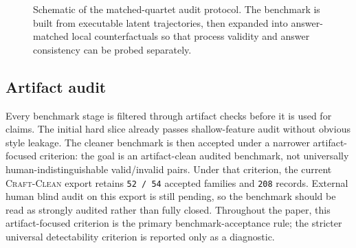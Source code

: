 \begin{figure}[t]
\centering
\setlength{\fboxsep}{10pt}
\caption{Schematic of the matched-quartet audit protocol. The benchmark is built
from executable latent trajectories, then expanded into answer-matched local
counterfactuals so that process validity and answer consistency can be probed
separately.}
\label{fig:quartet_protocol}
\end{figure}

\subsection{Artifact audit}

Every benchmark stage is filtered through artifact checks before it is used for
claims. The initial hard slice already passes shallow-feature audit without
obvious style leakage. The cleaner benchmark is then accepted under a narrower
artifact-focused criterion: the goal is an artifact-clean audited benchmark,
not universally human-indistinguishable valid/invalid pairs. Under that
criterion, the current \textsc{Craft-Clean} export retains \texttt{52 / 54}
accepted families and \texttt{208} records. External human blind audit on this
export is still pending, so the benchmark should be read as strongly audited
rather than fully closed.
Throughout the paper, this artifact-focused criterion is the primary
benchmark-acceptance rule; the stricter universal detectability criterion is
reported only as a diagnostic.

